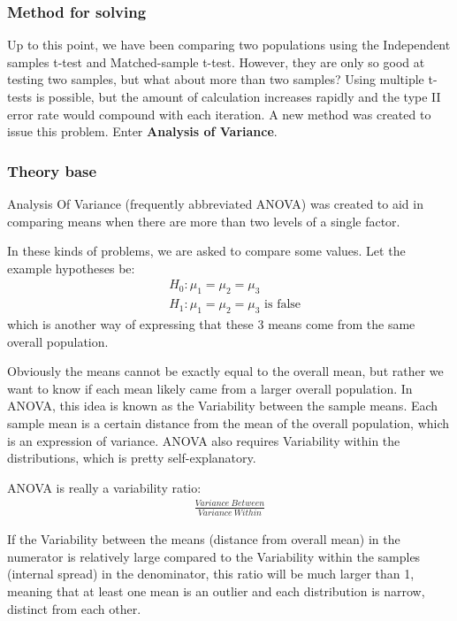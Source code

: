 \documentclass[a4paper]{article}
\numberwithin{equation}{section}
\begin{document}
\subsubsection{Method for solving}
Up to this point, we have been comparing two populations using the Independent samples t-test and Matched-sample t-test.
However, they are only so good at testing two samples, but what about more than two samples?
Using multiple t-tests is possible, but the amount of calculation increases rapidly and the type II error rate would compound with each iteration.
A new method was created to issue this problem.
Enter \textbf{Analysis of Variance}.

\subsubsection{Theory base}\label{anovaDef}
Analysis Of Variance (frequently abbreviated ANOVA) was created to aid in comparing means when there are more than two levels of a single factor.

In these kinds of problems, we are asked to compare some values. Let the example hypotheses be:
\begin{align*}
   & H_0: \mu_1 = \mu_2 = \mu_3                  \\
   & H_1: \mu_1 = \mu_2 = \mu_3 \text{ is false}
\end{align*}
which is another way of expressing that these 3 means come from the same overall population.

Obviously the means cannot be exactly equal to the overall mean, but rather we want to know if each mean likely came from a larger overall population.
In ANOVA, this idea is known as the Variability between the sample means.
Each sample mean is a certain distance from the mean of the overall population, which is an expression of variance.
ANOVA also requires Variability within the distributions, which is pretty self-explanatory.

ANOVA is really a variability ratio:
\begin{align*}
  \frac{Variance\ Between}{Variance\ Within}
\end{align*}

If the Variability between the means (distance from overall mean) in the numerator is relatively large compared to the Variability within the samples (internal spread) in the denominator, this ratio will be much larger than 1, meaning that at least one mean is an outlier and each distribution is narrow, distinct from each other.
\end{document}
